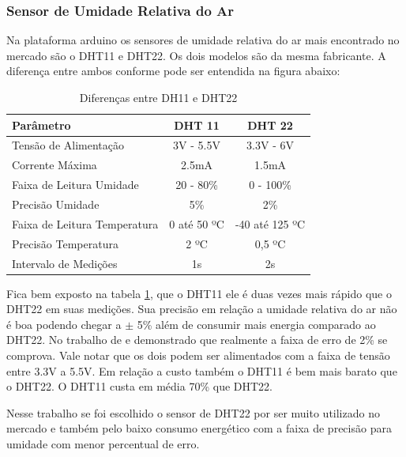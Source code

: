\subsubsection{Sensor de Umidade Relativa do Ar}

Na plataforma arduino os sensores de umidade relativa do ar mais encontrado no mercado são o DHT11 e DHT22. Os dois modelos são da mesma fabricante. A diferença entre ambos conforme \cite{AutoCoreBlog} pode ser entendida na figura abaixo:

\begin{table}[!h]
\centering
\begin{tabular}{|l|c|c|}
\hline
\textbf{Parâmetro}           & \textbf{DHT 11} & \textbf{DHT 22} \\ \hline
Tensão de Alimentação        & 3V - 5.5V       & 3.3V - 6V       \\ \hline
Corrente Máxima              & 2.5mA           & 1.5mA           \\ \hline
Faixa de Leitura Umidade     & 20 - 80\%       & 0 - 100\%       \\ \hline
Precisão Umidade             & 5\%             & 2\%             \\ \hline
Faixa de Leitura Temperatura & 0 até 50 ºC     & -40 até 125 ºC  \\ \hline
Precisão Temperatura         & 2 ºC            & 0,5 ºC          \\ \hline
Intervalo de Medições        & 1s              & 2s              \\ \hline
\end{tabular}
\caption{Diferenças entre DH11 e DHT22}
\label{tab:dhtsensor}
\end{table}

Fica bem exposto na tabela \ref{tab:dhtsensor}, que o DHT11 ele é duas vezes mais rápido que o DHT22 em suas medições. Sua precisão em relação a umidade relativa do ar não é boa podendo chegar a $\pm$ 5\% além de consumir mais energia comparado ao DHT22. No trabalho de \cite{ribeiro2016avaliaccao} e demonstrado que realmente a faixa de erro de 2\% se comprova. Vale notar que os dois podem ser alimentados com a faixa de tensão entre 3.3V a 5.5V. Em relação a custo também o DHT11 é bem mais barato que o DHT22. O DHT11 custa em média 70\% que DHT22.

Nesse trabalho se foi escolhido o sensor de DHT22 por ser muito utilizado no mercado e também pelo baixo consumo energético com a faixa de precisão para umidade com menor percentual de erro.

